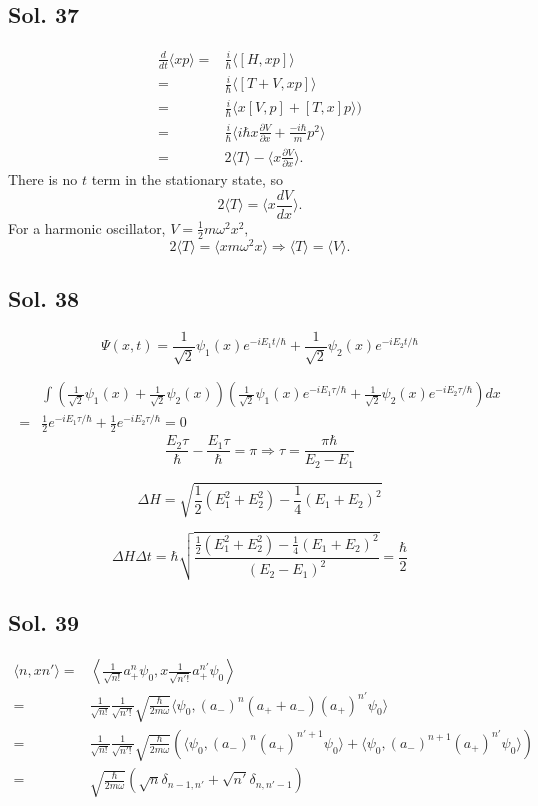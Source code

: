 \subsection*{Sol. 37}
\begin{align*}
    \frac{d}{dt}\langle xp\rangle
    =&\frac{i}{\hbar}
    \langle[H,xp]\rangle\\
    =&\frac{i}{\hbar}
    \langle[T+V,xp]\rangle\\
    =&\frac{i}{\hbar}
    \langle x[V,p]+[T,x]p\rangle)\\
    =&\frac{i}{\hbar}
    \langle i\hbar x\frac{\partial V}{\partial x}+\frac{-i\hbar}{m}p^2\rangle\\
    =&2\langle T\rangle-\langle x\frac{\partial V}{\partial x}\rangle.
\end{align*}
There is no $t$ term in the stationary state, so
$$
2\langle T\rangle=\langle x\frac{d V}{d x}\rangle.
$$
For a harmonic oscillator, $V=\frac{1}{2}m\omega^2x^2,$
$$
2\langle T \rangle = \langle xm\omega^2x\rangle\Rightarrow
\langle T\rangle=\langle V\rangle.
$$

\subsection*{Sol. 38}
$$
\Psi(x,t) = 
\frac{1}{\sqrt{2}}\psi_1(x)e^{-iE_1t/\hbar} +
\frac{1}{\sqrt{2}}\psi_2(x)e^{-iE_2t/\hbar}
$$

\begin{align*}
    &\int 
    \left(\frac{1}{\sqrt{2}}\psi_1(x) +
\frac{1}{\sqrt{2}}\psi_2(x)\right)
    \left(\frac{1}{\sqrt{2}}\psi_1(x)e^{-iE_1\tau/\hbar} +
\frac{1}{\sqrt{2}}\psi_2(x)e^{-iE_2\tau/\hbar}\right)dx\\
=&
\frac{1}{2}e^{-iE_1\tau/\hbar}
+\frac{1}{2}e^{-iE_2\tau/\hbar}=0
\end{align*}
$$
\frac{E_2\tau}{\hbar}-\frac{E_1\tau}{\hbar}=\pi 
\Rightarrow\tau=\frac{\pi\hbar}{E_2-E_1}
$$

$$
\Delta H = \sqrt{\frac{1}{2}(E_1^2+E_2^2)-\frac{1}{4}(E_1+E_2)^2}
$$

$$
\Delta H\Delta t
=
\hbar\sqrt{\frac{\frac{1}{2}(E_1^2+E_2^2)-\frac{1}{4}(E_1+E_2)^2}{(E_2-E_1)^2}} = \frac{\hbar}{2}
$$
\subsection*{Sol. 39}

\begin{align*}
    \langle n,xn'\rangle
    =& \left\langle \frac{1}{\sqrt{n!}}
    a_+^n\psi_0,
    x\frac{1}{\sqrt{n'!}}a_+^{n'}\psi_0\right\rangle\\
    =&
    \frac{1}{\sqrt{n!}}
    \frac{1}{\sqrt{n'!}}
    \sqrt{\frac{\hbar}{2m\omega}}
    \langle \psi_0, (a_-)^{n}(a_++a_-)(a_+)^{n'}\psi_0\rangle\\
    =&\frac{1}{\sqrt{n!}}
    \frac{1}{\sqrt{n'!}}
    \sqrt{\frac{\hbar}{2m\omega}}
    (\langle \psi_0, (a_-)^{n}(a_+)^{n'+1}\psi_0\rangle
    +\langle \psi_0, (a_-)^{n+1}(a_+)^{n'}\psi_0\rangle
    )\\
    =&\sqrt{\frac{\hbar}{2m\omega}}(\sqrt{n}\delta_{n-1,n'}+\sqrt{n'}\delta_{n,n'-1})
\end{align*}


